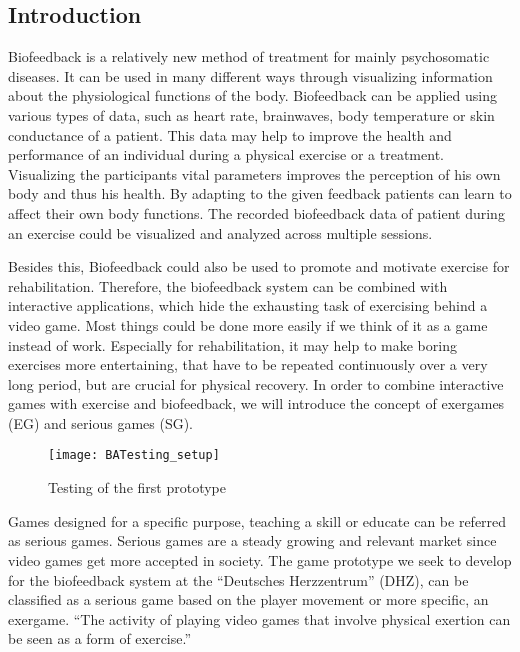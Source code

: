 \begin{multicols}{2}

\section{Introduction}
Biofeedback is a relatively new method of treatment for mainly psychosomatic diseases. It can be used in many different ways through visualizing information about the physiological functions of the body. Biofeedback can be applied using various types of data, such as heart rate, brainwaves, body temperature or skin conductance of a patient. This data may help to improve the health and performance of an individual during a physical exercise or a treatment. Visualizing the participants vital parameters improves the perception of his own body and thus his health. 
By adapting to the given feedback patients can learn to affect their own body functions.\cite{BF2007} The recorded biofeedback data of patient during an exercise could be visualized and analyzed across multiple sessions. 

Besides this, Biofeedback could also be used to promote and motivate exercise for rehabilitation. Therefore, the biofeedback system can be combined with interactive applications, which hide the exhausting task of exercising behind a video game. Most things could be done more easily if we think of it as a game instead of work. Especially for rehabilitation, it may help to make boring exercises more entertaining, that have to be repeated continuously over a very long period, but are crucial for physical recovery. In order to combine interactive games with
exercise and biofeedback, we will introduce the concept of exergames (EG) and serious games (SG).
\begin{figure}[H]
  \centering
    \texttt{[image: BATesting\_setup]}
 \caption{Testing of the first prototype}
\end{figure}
Games designed for a specific purpose, teaching a skill or educate can be referred as serious games. \cite{Derryberry} Serious games are a steady growing and relevant market since video games get more accepted in society. \cite{SGIndustry} The game prototype we seek to develop for the biofeedback system at the “Deutsches Herzzentrum” (DHZ), can be classified as a serious game based on the player movement or more specific, an exergame. “The activity of playing video games that involve physical exertion can be seen as a form of exercise.” \cite{ExergameDef}


\end{multicols}
